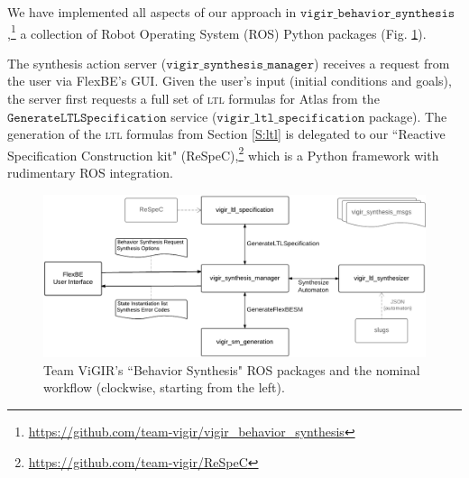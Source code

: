 
We have implemented all aspects of our approach in $\mathtt{vigir\_behavior\_synthesis}$,\footnote{\scriptsize{\url{https://github.com/team-vigir/vigir_behavior_synthesis}}}
 a collection of Robot Operating System (ROS) Python packages (Fig. \ref{Fig:vigir_behavior_synthesis}).

The synthesis action server ($\mathtt{vigir\_synthesis\_manager}$) receives a request from the user via FlexBE's GUI.
Given the user's input (initial conditions and goals), the server first requests a full set of \textsc{ltl} formulas for Atlas from the $\mathtt{Generate LTL Specification}$ service ($\mathtt{vigir\_ltl\_specification}$ package).
The generation of the \textsc{ltl} formulas from Section \ref{S:ltl} is delegated to our ``Reactive Specification Construction kit" (ReSpeC),\footnote{\scriptsize{\url{https://github.com/team-vigir/ReSpeC}}}
 which is a Python framework with rudimentary ROS integration.

\begin{figure}[t]
\centering
\includegraphics[width=\columnwidth,clip]{./img/behavior_synthesis_packages.png}
\caption{
	Team ViGIR's ``Behavior Synthesis" ROS packages and the nominal workflow (clockwise, starting from the left).
}
\label{Fig:vigir_behavior_synthesis}
\vspace{-10pt}
\end{figure}


